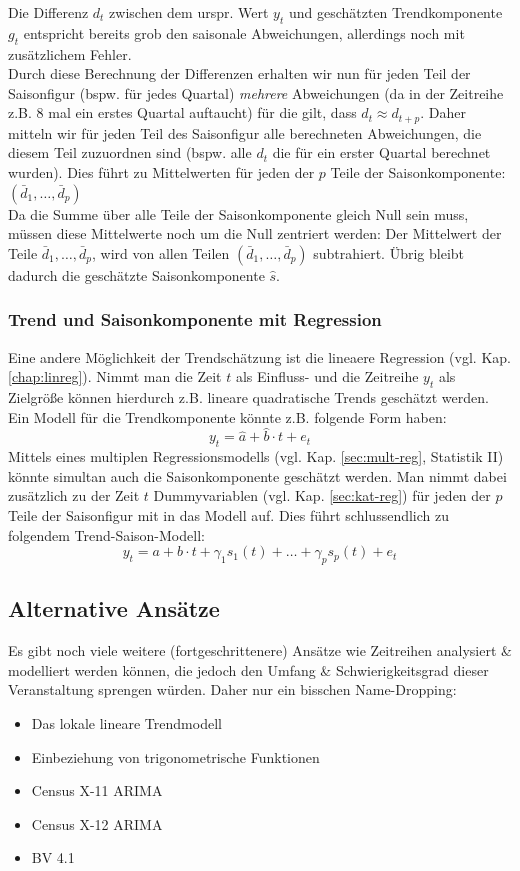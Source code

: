 \documentclass[a4paper]{article}
\begin{document}
\noindent Die Differenz $d_t$ zwischen dem urspr. Wert $y_t$ und geschätzten Trendkomponente $g_t$ entspricht bereits grob den saisonale Abweichungen, allerdings noch mit zusätzlichem Fehler.\\
Durch diese Berechnung der Differenzen erhalten wir nun für jeden Teil der Saisonfigur (bspw. für jedes Quartal) \textit{mehrere} Abweichungen (da in der Zeitreihe z.B. 8 mal ein erstes Quartal auftaucht) für die gilt, dass $d_t\approx d_{t+p}$. Daher mitteln wir für jeden Teil des Saisonfigur alle berechneten Abweichungen, die diesem Teil zuzuordnen sind (bspw. alle $d_t$ die für ein erster Quartal berechnet wurden). Dies führt zu Mittelwerten für jeden der $p$ Teile der Saisonkomponente: $(\bar{d}_1, \hdots, \bar{d}_p)$\\
Da die Summe über alle Teile der Saisonkomponente gleich Null sein muss, müssen diese Mittelwerte noch um die Null zentriert werden: Der Mittelwert der Teile $\bar{d}_1, \hdots, \bar{d}_p$, wird von allen Teilen $(\bar{d}_1, \hdots, \bar{d}_p)$ subtrahiert. Übrig bleibt dadurch die geschätzte Saisonkomponente $\hat{s}$.

\subsubsection{Trend und Saisonkomponente mit Regression}
Eine andere Möglichkeit der Trendschätzung ist die lineaere Regression (vgl. Kap. \ref{chap:linreg}). Nimmt man die Zeit $t$ als Einfluss- und die Zeitreihe $y_t$ als Zielgröße können hierdurch z.B. lineare quadratische Trends geschätzt werden. Ein Modell für die Trendkomponente könnte z.B. folgende Form haben: 
$$y_t=\hat{a}+\hat{b}\cdot t + e_t$$
\noindent Mittels eines multiplen Regressionsmodells (vgl. Kap. \ref{sec:mult-reg}, Statistik II) könnte simultan auch die Saisonkomponente geschätzt werden. Man nimmt dabei zusätzlich zu der Zeit $t$ Dummyvariablen (vgl. Kap. \ref{sec:kat-reg}) für jeden der $p$ Teile der Saisonfigur mit in das Modell auf. Dies führt schlussendlich zu folgendem Trend-Saison-Modell:
$$y_t=a + b \cdot t + \gamma_1 s_1(t) + \hdots + \gamma_{p} s_{p}(t) + e_t$$

\subsection{Alternative Ansätze}
Es gibt noch viele weitere (fortgeschrittenere) Ansätze wie Zeitreihen analysiert \& modelliert werden können, die jedoch den Umfang \& Schwierigkeitsgrad dieser Veranstaltung sprengen würden. Daher nur ein bisschen Name-Dropping:
\begin{itemize}
    \item Das lokale lineare Trendmodell
    \item Einbeziehung von trigonometrische Funktionen
    \item Census X-11 ARIMA
    \item Census X-12 ARIMA
    \item BV 4.1
\end{itemize}
\end{document}
